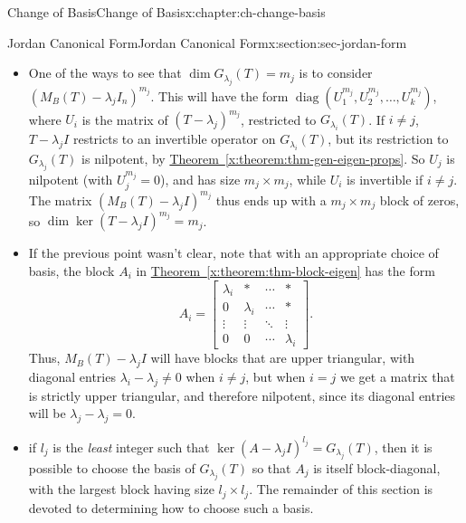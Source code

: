 \documentclass[oneside,10pt,]{book}
\newcommand{\xreffont}{\relax}
\numberwithin{equation}{section}
\newcommand{\bbm}{\begin{bmatrix}}
\newcommand{\ebm}{\end{bmatrix}}
\newcommand{\diag}{\operatorname{diag}}
\newcommand{\amp}{&}
\begin{document}
\begin{chapterptx}{Change of Basis}{}{Change of Basis}{}{}{x:chapter:ch-change-basis}
\begin{sectionptx}{Jordan Canonical Form}{}{Jordan Canonical Form}{}{}{x:section:sec-jordan-form}
\begin{itemize}[label=\textbullet]
\item{}One of the ways to see that \(\dim G_{\lambda_j}(T)=m_j\) is to consider \((M_B(T)-\lambda_j I_n)^{m_j}\). This will have the form \(\diag(U_1^{m_j}, U_2^{m_j},\ldots, U_k^{m_j})\), where \(U_i\) is the matrix of \((T-\lambda_j)^{m_j}\), restricted to \(G_{\lambda_i}(T)\). If \(i\neq j\), \(T-\lambda_j I\) restricts to an invertible operator on \(G_{\lambda_i}(T)\), but its restriction to \(G_{\lambda_j}(T)\) is nilpotent, by \hyperref[x:theorem:thm-gen-eigen-props]{Theorem~{\xreffont\ref{x:theorem:thm-gen-eigen-props}}}. So \(U_j\) is nilpotent (with \(U_j^{m_j}=0\)), and has size \(m_j\times m_j\), while \(U_i\) is invertible if \(i\neq j\). The matrix \((M_B(T)-\lambda_j I)^{m_j}\) thus ends up with a \(m_j\times m_j\) block of zeros, so \(\dim \ker (T-\lambda_j I)^{m_j}=m_j\).%
\item{}If the previous point wasn't clear, note that with an appropriate choice of basis, the block \(A_i\) in \hyperref[x:theorem:thm-block-eigen]{Theorem~{\xreffont\ref{x:theorem:thm-block-eigen}}} has the form%
\begin{equation*}
A_i = \bbm \lambda_i \amp \ast \amp \cdots \amp \ast\\
0 \amp \lambda_i \amp \cdots \amp \ast\\
\vdots \amp \vdots \amp \ddots\amp \vdots\\
0 \amp 0 \amp \cdots \amp \lambda_i\ebm\text{.}
\end{equation*}
Thus, \(M_B(T)-\lambda_j I\) will have blocks that are upper triangular, with diagonal entries \(\lambda_i-\lambda_j\neq 0\) when \(i\neq j\), but when \(i=j\) we get a matrix that is strictly upper triangular, and therefore nilpotent, since its diagonal entries will be \(\lambda_j-\lambda_j=0\).%
\item{}if \(l_j\) is the \emph{least} integer such that \(\ker (A-\lambda_j I)^{l_j}=G_{\lambda_j}(T)\), then it is possible to choose the basis of \(G_{\lambda_j}(T)\) so that \(A_j\) is itself block-diagonal, with the largest block having size \(l_j\times l_j\). The remainder of this section is devoted to determining how to choose such a basis.%
\end{itemize}
%
\par

\end{sectionptx}
\end{chapterptx}
\end{document}
